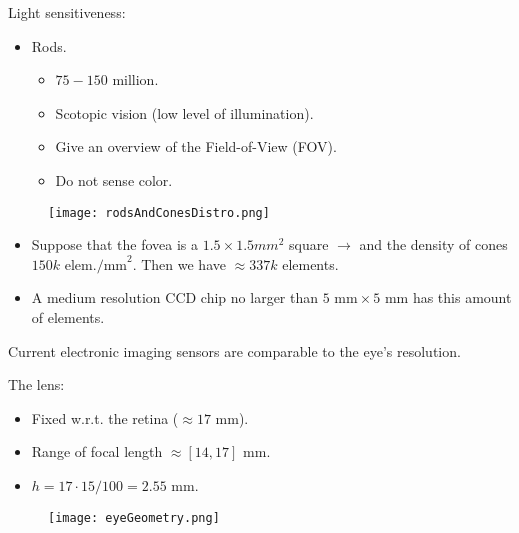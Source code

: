 \begin{frame}
Light sensitiveness:
\begin{itemize}
\item Rods.
\begin{itemize}
\item $75-150$ million.
\item Scotopic vision (low level of illumination).
\item Give an overview of the Field-of-View (FOV).
\item Do not sense color.
\end{itemize}
\end{itemize}
\begin{figure}
\texttt{[image: rodsAndConesDistro.png]}
\end{figure}
\end{frame}


\begin{frame}
\begin{itemize}
\item Suppose that the fovea is a $1.5\times 1.5 mm^{2}$ square $\rightarrow$ and the density of cones $150k\text{ elem./mm}^{2}$. Then we have $\approx 337k$ elements.
\item A medium resolution CCD chip no larger than $5\text{ mm}\times\text{5 mm}$ has this amount of elements.
\end{itemize}
\begin{block}{}
Current electronic imaging sensors are comparable to the eye's resolution.
\end{block}
\end{frame}


\begin{frame}
The lens:
\begin{itemize}
\item Fixed w.r.t. the retina ($\approx 17\text{ mm}$).
\item Range of focal length $\approx [14,17]$ mm.
\item $h=17\cdot 15/100	= 2.55$ mm.
\end{itemize}
\begin{figure}
\texttt{[image: eyeGeometry.png]}
\end{figure}
\end{frame}

